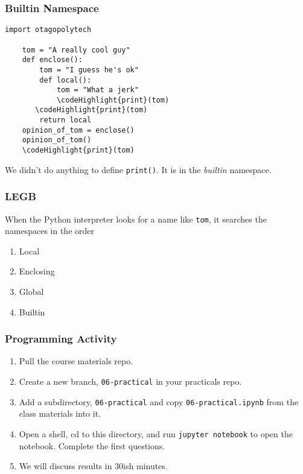 \documentclass[10pt]{beamer}
\newcommand\codeHighlight[1]{\textcolor[rgb]{1,0,0}{\textbf{#1}}}
\begin{document}
\begin{frame}[fragile]
  \frametitle{Builtin Namespace}

  \begin{Verbatim}[commandchars=\\\{\}]
    import otagopolytech
    
    tom = "A really cool guy"
    def enclose():
        tom = "I guess he's ok"
        def local():
            tom = "What a jerk"
            \codeHighlight{print}(tom)
       \codeHighlight{print}(tom)
        return local        
    opinion_of_tom = enclose()
    opinion_of_tom()   
    \codeHighlight{print}(tom)
  \end{Verbatim}
  We didn't do anything to define \texttt{print()}. It is in the \emph{builtin} namespace.
\end{frame}

\begin{frame}
  \frametitle{LEGB}

  When the Python interpreter looks for a name like \texttt{tom}, it searches
  the namespaces in the order
  
  \begin{enumerate}
    \item Local
    \item Enclosing
    \item Global
    \item Builtin
  \end{enumerate}  
  
\end{frame}




\begin{frame}
  \frametitle{Programming Activity}
  
  \begin{enumerate}
    \item Pull the course materials repo.
    \item Create a new branch, \texttt{06-practical} in your practicals repo.
    \item Add a subdirectory,  \texttt{06-practical} and copy \texttt{06-practical.ipynb} from the class materials into it.
    \item Open a shell, cd to this directory, and run \texttt{jupyter notebook} to open the notebook. Complete the first questions.
    \item We will discuss results in 30ish minutes.
  \end{enumerate}      
\end{frame}
\end{document}
